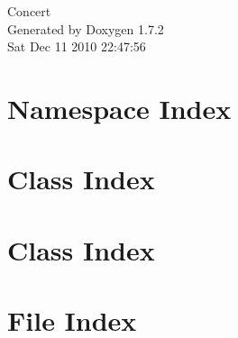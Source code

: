 \documentclass[a4paper]{book}
\begin{document}
\hypersetup{pageanchor=false}
\begin{titlepage}
\vspace*{7cm}
\begin{center}
{\Large Concert }\\
\vspace*{1cm}
{\large Generated by Doxygen 1.7.2}\\
\vspace*{0.5cm}
{\small Sat Dec 11 2010 22:47:56}\\
\end{center}
\end{titlepage}
\clearemptydoublepage
{}
\tableofcontents
\clearemptydoublepage
{}
\hypersetup{pageanchor=true}
\chapter{Namespace Index}

\chapter{Class Index}

\chapter{Class Index}

\chapter{File Index}

\end{document}
